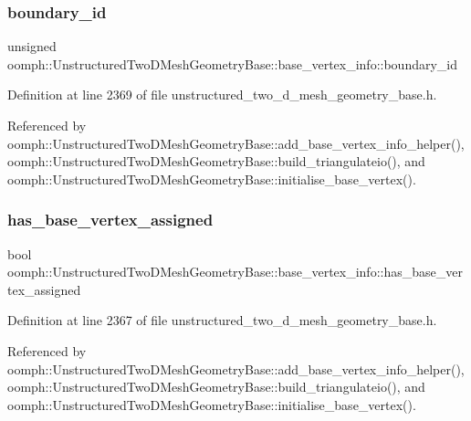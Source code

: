 \subsubsection{\texorpdfstring{boundary\+\_\+id}{boundary\_id}}
{\footnotesize\ttfamily unsigned oomph\+::\+Unstructured\+Two\+D\+Mesh\+Geometry\+Base\+::base\+\_\+vertex\+\_\+info\+::boundary\+\_\+id}



Definition at line 2369 of file unstructured\+\_\+two\+\_\+d\+\_\+mesh\+\_\+geometry\+\_\+base.\+h.



Referenced by oomph\+::\+Unstructured\+Two\+D\+Mesh\+Geometry\+Base\+::add\+\_\+base\+\_\+vertex\+\_\+info\+\_\+helper(), oomph\+::\+Unstructured\+Two\+D\+Mesh\+Geometry\+Base\+::build\+\_\+triangulateio(), and oomph\+::\+Unstructured\+Two\+D\+Mesh\+Geometry\+Base\+::initialise\+\_\+base\+\_\+vertex().

\mbox{\label{structoomph_1_1UnstructuredTwoDMeshGeometryBase_1_1base__vertex__info_a3448db94f297b6d9d01d23ed3c21228c}} 
\subsubsection{\texorpdfstring{has\+\_\+base\+\_\+vertex\+\_\+assigned}{has\_base\_vertex\_assigned}}
{\footnotesize\ttfamily bool oomph\+::\+Unstructured\+Two\+D\+Mesh\+Geometry\+Base\+::base\+\_\+vertex\+\_\+info\+::has\+\_\+base\+\_\+vertex\+\_\+assigned}



Definition at line 2367 of file unstructured\+\_\+two\+\_\+d\+\_\+mesh\+\_\+geometry\+\_\+base.\+h.



Referenced by oomph\+::\+Unstructured\+Two\+D\+Mesh\+Geometry\+Base\+::add\+\_\+base\+\_\+vertex\+\_\+info\+\_\+helper(), oomph\+::\+Unstructured\+Two\+D\+Mesh\+Geometry\+Base\+::build\+\_\+triangulateio(), and oomph\+::\+Unstructured\+Two\+D\+Mesh\+Geometry\+Base\+::initialise\+\_\+base\+\_\+vertex().

